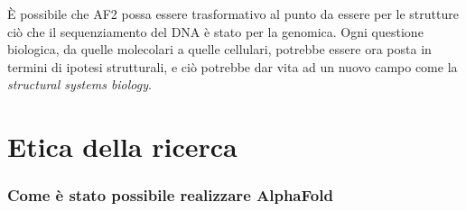 È possibile che AF2 possa essere trasformativo al punto da essere per le strutture ciò che il sequenziamento del DNA è stato per la genomica. Ogni questione biologica, da quelle molecolari a quelle cellulari, potrebbe essere ora posta in termini di ipotesi strutturali, e ciò potrebbe dar vita ad un nuovo campo come la \textit{structural systems biology}\supercite{moalqAF2}. \\

\section{Etica della ricerca}

\subsubsection{Come è stato possibile realizzare AlphaFold}
